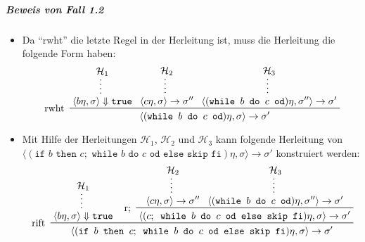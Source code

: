 													\subparagraph{Beweis von Fall 1.2}
														\begin{itemize}
															\item Da \enquote{rwht} die letzte Regel in der Herleitung ist, muss die Herleitung die folgende Form haben:
																\begin{equation*}
																	\prftree[l]
																	{ rwht }
																	{ \prfsummary{\mathcal{H} _ 1}{\langle b\eta, \sigma \rangle \Downarrow \texttt{true}} }
																	{ \prfsummary{\mathcal{H} _ 2}{\langle c\eta, \sigma \rangle \rightarrow \sigma''} }
																	{ \prfsummary{\mathcal{H} _ 3}{\langle (\texttt{while } b \texttt{ do } c \texttt{ od})\eta, \sigma'' \rangle \rightarrow \sigma'} }
																	{ \langle (\texttt{while } b \texttt{ do } c \texttt{ od})\eta, \sigma \rangle \rightarrow \sigma' }
																\end{equation*}
															\item Mit Hilfe der Herleitungen $ \mathcal{H} _ 1 $, $ \mathcal{H} _ 2 $ und $ \mathcal{H} _ 3 $ kann folgende Herleitung von \\ $ \langle (\texttt{if } b \texttt{ then } c ; \texttt{ while } b \texttt{ do } c \texttt{ od else skip fi}) \eta, \sigma \rangle \rightarrow \sigma' $ konstruiert werden:
																\begin{equation*}
																	\prftree[l]
																	{ rift }
																	{ \prfsummary{\mathcal{H} _ 1}{\langle b\eta, \sigma \rangle \Downarrow \texttt{true}} }
																	{
																		\prftree[l]
																		{ r; }
																		{ \prfsummary{\mathcal{H} _ 2}{\langle c\eta, \sigma \rangle \rightarrow \sigma''} }
																		{ \prfsummary{\mathcal{H} _ 3}{\langle (\texttt{while } b \texttt{ do } c \texttt{ od})\eta, \sigma'' \rangle \rightarrow \sigma'} }
																		{ \langle (c ; \texttt{ while } b \texttt{ do } c \texttt{ od else skip fi})\eta, \sigma \rangle \rightarrow \sigma' }
																	}
																	{ \langle (\texttt{if } b \texttt{ then } c ; \texttt{ while } b \texttt{ do } c \texttt{ od else skip fi}) \eta, \sigma \rangle \rightarrow \sigma' }
																\end{equation*}
														\end{itemize}


